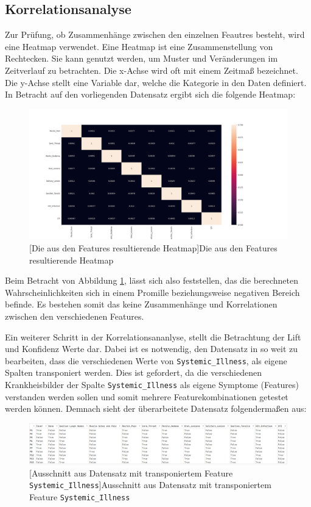 \documentclass[13pt,a4paper, listof=entryprefix, bibliography=totocnumbered,toc=listofnumbered,lof=listofnumbered]{scrartcl}
\begin{document}
	\subsection{Korrelationsanalyse}
		\label{ch:korrleations_analyse}

	Zur Prüfung, ob Zusammenhänge zwischen den einzelnen Feautres besteht, wird eine Heatmap verwendet. 
	Eine Heatmap ist eine Zusammenstellung von Rechtecken. Sie kann genutzt werden, um Muster und Veränderungen im
	Zeitverlauf zu betrachten. Die x-Achse wird oft mit einem Zeitmaß bezeichnet. Die y-Achse stellt eine Variable dar, 
	welche die Kategorie in den Daten definiert. In Betracht auf den vorliegenden Datensatz ergibt sich die folgende Heatmap:

	\begin{figure}[H]
		\centering
		\includegraphics[width=0.8\linewidth]{Bilder/heat_map.png}
		[Die aus den Features resultierende Heatmap]{Die aus den Features resultierende Heatmap}
		\label{fig:heatmap}
	\end{figure}
	
	Beim Betracht von Abbildung \ref{fig:heatmap}, lässt sich also feststellen, das die berechneten Wahrscheinlichkeiten sich in einem Promille beziehungsweise 
	negativen Bereich befinde. Es bestehen somit das keine Zusammenhänge und Korrelationen zwischen den verschiedenen Features. 

	Ein weiterer Schritt in der Korrelationsananlyse, stellt die Betrachtung der Lift und Konfidenz Werte dar. Dabei ist es notwendig, den 
	Datensatz in so weit zu bearbeiten, dass die verschiedenen Werte von \lstinline{Systemic_Illness}, als eigene Spalten transponiert werden. 
	Dies ist gefordert, da die verschiedenen Krankheisbilder der Spalte \lstinline{Systemic_Illness} als eigene Symptome (Features) verstanden werden sollen und somit mehrere Featurekombinationen 
	getestet werden können. Demnach sieht der überarbeitete Datensatz folgendermaßen aus: 

	\begin{figure}[H]
		\centering
		\includegraphics[width=0.8\linewidth]{Bilder/tranp_df.png}
		[Ausschnitt aus Datensatz mit transponiertem Feature \lstinline{Systemic_Illness}]{Ausschnitt aus Datensatz mit transponiertem Feature \lstinline{Systemic_Illness}}
		\label{fig:transp_feature}
	\end{figure}
\end{document}

